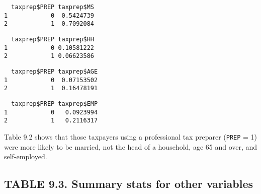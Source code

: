 \documentclass[]{book}
\newenvironment{Shaded}{\begin{snugshade}}{\end{snugshade}}
\newcommand{\KeywordTok}[1]{\textcolor[rgb]{0.13,0.29,0.53}{\textbf{#1}}}
\newcommand{\NormalTok}[1]{#1}
\newcommand{\OperatorTok}[1]{\textcolor[rgb]{0.81,0.36,0.00}{\textbf{#1}}}
\begin{document}
\begin{verbatim}
  taxprep$PREP taxprep$MS
1            0  0.5424739
2            1  0.7092084
\end{verbatim}

\begin{Shaded}
\end{Shaded}

\begin{verbatim}
  taxprep$PREP taxprep$HH
1            0 0.10581222
2            1 0.06623586
\end{verbatim}

\begin{Shaded}
\end{Shaded}

\begin{verbatim}
  taxprep$PREP taxprep$AGE
1            0  0.07153502
2            1  0.16478191
\end{verbatim}

\begin{Shaded}
\end{Shaded}

\begin{verbatim}
  taxprep$PREP taxprep$EMP
1            0   0.0923994
2            1   0.2116317
\end{verbatim}

Table 9.2 shows that those taxpayers using a professional tax preparer (\texttt{PREP} = 1) were more likely to be married, not the head of a household, age 65 and over, and self-employed.

\hypertarget{table-9.3.-summary-stats-for-other-variables}{%
\subsection{TABLE 9.3. Summary stats for other variables}\label{table-9.3.-summary-stats-for-other-variables}}
\end{document}
